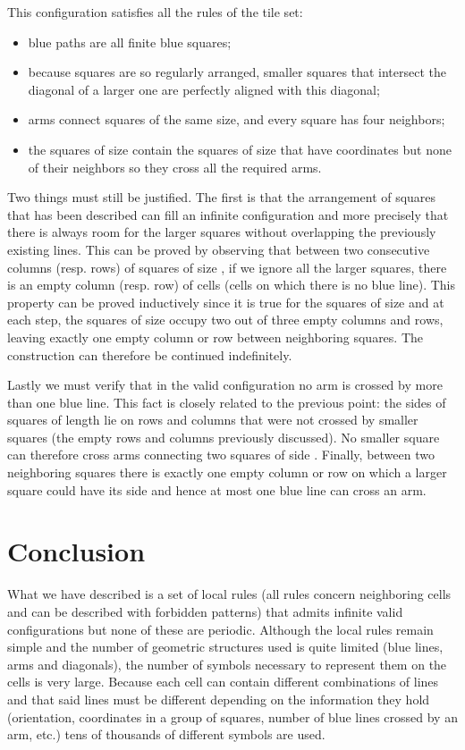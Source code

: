 \documentclass{jac}
\begin{document}
This configuration satisfies all the rules of the tile set:
\begin{itemize}
	\item blue paths are all finite blue squares;
	\item because squares are so regularly arranged, smaller squares that intersect the diagonal of a larger one are perfectly aligned with this diagonal;
	\item arms connect squares of the same size, and every square has four neighbors;
	\item the squares of size  contain the squares of size  that have coordinates  but none of their neighbors so they cross all the required arms.
\end{itemize}

Two things must still be justified. The first is that the arrangement of squares that has been described can fill an infinite configuration and more precisely that there is always room for the larger squares without overlapping the previously existing lines. This can be proved by observing that between two consecutive columns (resp. rows) of squares of size , if we ignore all the larger squares, there is an empty column (resp. row) of cells (cells on which there is no blue line). This property can be proved inductively since it is true for the squares of size  and at each step, the squares of size  occupy two out of three empty columns and rows, leaving exactly one empty column or row between neighboring squares. The construction can therefore be continued indefinitely.

Lastly we must verify that in the valid configuration no arm is crossed by more than one blue line. This fact is closely related to the previous point: the sides of squares of length  lie on rows and columns that were not crossed by smaller squares (the empty rows and columns previously discussed). No smaller square can therefore cross arms connecting two squares of side . Finally, between two neighboring squares there is exactly one empty column or row on which a larger square could have its side and hence at most one blue line can cross an arm.


\section{Conclusion} \label{sec:conclusion}

What we have described is a set of local rules (all rules concern neighboring cells and can be described with  forbidden patterns) that admits infinite valid configurations but none of these are periodic. Although the local rules remain simple and the number of geometric structures used is quite limited (blue lines, arms and diagonals), the number of symbols necessary to represent them on the cells is very large. Because each cell can contain different combinations of lines and that said lines must be different depending on the information they hold (orientation, coordinates in a group of squares, number of blue lines crossed by an arm, etc.) tens of thousands of different symbols are used.
\end{document}
